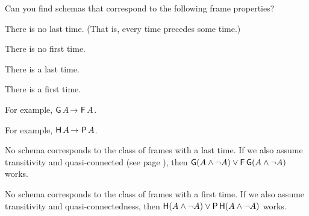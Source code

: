 

\begin{exercise}
  Can you find schemas that correspond to the following frame properties?
  \begin{exlist}
  \item There is no last time. (That is, every time precedes some time.)
  \item There is no first time. 
  \item There is a last time.
  \item There is a first time.
  \end{exlist}
\end{exercise}
\begin{solution}
  \begin{sollist}
    \item For example, $\tG A \to \tF A$.
  \item For example, $\tH A \to \tP A$.
  \item No schema corresponds to the class of frames with a last time. If we
  also assume transitivity and quasi-connected (see page
  \pageref{quasiconnected}), then
  $\operatorname{\mathsf{G}}(A \land \neg A) \lor \operatorname{\mathsf{F}}\operatorname{\mathsf{G}}(A \land \neg A)$ works.
  \item No schema corresponds to the class of frames with a first time. If we
    also assume transitivity and quasi-connectedness, then
    $\operatorname{\mathsf{H}}(A \land \neg A) \lor \operatorname{\mathsf{P}}\operatorname{\mathsf{H}}(A \land \neg A)$ works.
  \end{sollist}
\end{solution}
\vspace{-2mm}

